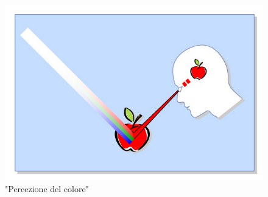 \documentclass[a4paper,11pt]{article}
\begin{document}
        \begin{figure}[h]
            \centering
            \includegraphics[scale=0.8]{colorimetria1}
            \caption{"Percezione del colore"}
        \end{figure}
        \newpage
\end{document}
